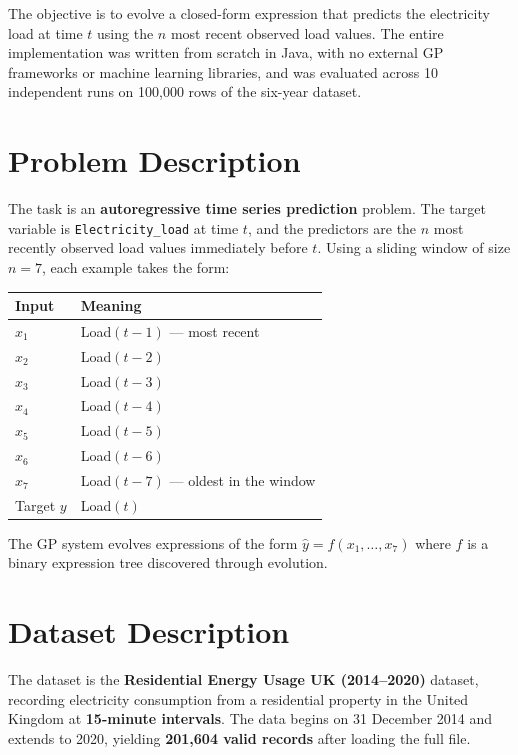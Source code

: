 \documentclass[12pt,a4paper]{article}
\begin{document}
The objective is to evolve a closed-form expression that predicts the electricity load at time $t$ using the $n$ most recent observed load values. The entire implementation was written from scratch in Java, with no external GP frameworks or machine learning libraries, and was evaluated across 10 independent runs on 100,000 rows of the six-year dataset.

\section*{Problem Description}

The task is an \textbf{autoregressive time series prediction} problem. The target variable is \texttt{Electricity\_load} at time $t$, and the predictors are the $n$ most recently observed load values immediately before $t$. Using a sliding window of size $n = 7$, each example takes the form:

\begin{center}
\begin{tabular}{ll}
\toprule
\textbf{Input} & \textbf{Meaning} \\
\midrule
$x_1$ & Load$(t-1)$ --- most recent \\
$x_2$ & Load$(t-2)$ \\
$x_3$ & Load$(t-3)$ \\
$x_4$ & Load$(t-4)$ \\
$x_5$ & Load$(t-5)$ \\
$x_6$ & Load$(t-6)$ \\
$x_7$ & Load$(t-7)$ --- oldest in the window \\
Target $y$ & Load$(t)$ \\
\bottomrule
\end{tabular}
\end{center}

The GP system evolves expressions of the form $\hat{y} = f(x_1, \ldots, x_7)$ where $f$ is a binary expression tree discovered through evolution.

\section{Dataset Description}

The dataset is the \textbf{Residential Energy Usage UK (2014--2020)} dataset, recording electricity consumption from a residential property in the United Kingdom at \textbf{15-minute intervals}. The data begins on 31 December 2014 and extends to 2020, yielding \textbf{201,604 valid records} after loading the full file.
\end{document}
